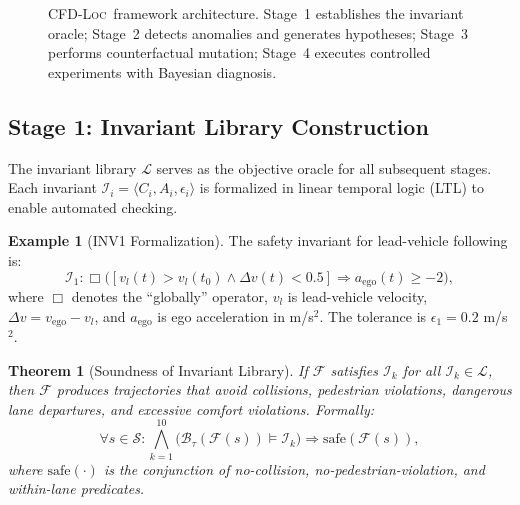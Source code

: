\documentclass[journal]{IEEEtran}
\theoremstyle{plain}
\newtheorem{theorem}{Theorem}[section]
\theoremstyle{definition}
\newtheorem{example}{Example}[section]
\theoremstyle{remark}
\newcommand{\methodname}{\textsc{CFD-Loc}}
\newcommand{\invlib}{\mathcal{L}}
\newcommand{\scenario}{\mathcal{S}}
\newcommand{\sys}{\mathcal{F}}
\newcommand{\beh}{\mathcal{B}}
\begin{document}
\begin{figure}[t]
\caption{\methodname\ framework architecture. Stage~1 establishes the invariant oracle; Stage~2 detects anomalies and generates hypotheses; Stage~3 performs counterfactual mutation; Stage~4 executes controlled experiments with Bayesian diagnosis.}
\label{fig:pipeline}
\end{figure}

\subsection{Stage 1: Invariant Library Construction}

The invariant library $\invlib$ serves as the objective oracle for all subsequent stages. Each invariant $\mathcal{I}_i = \langle C_i, A_i, \epsilon_i \rangle$ is formalized in linear temporal logic (LTL) to enable automated checking.

\begin{example}[INV1 Formalization]\label{ex:inv1}
The safety invariant for lead-vehicle following is:
\begin{equation}
\mathcal{I}_1: \Box \big( [v_l(t) > v_l(t_0) \land \Delta v(t) < 0.5] \Rightarrow a_{\text{ego}}(t) \geq -2 \big),
\label{eq:inv1}
\end{equation}
where $\Box$ denotes the ``globally'' operator, $v_l$ is lead-vehicle velocity, $\Delta v = v_{\text{ego}} - v_l$, and $a_{\text{ego}}$ is ego acceleration in m/s$^2$. The tolerance is $\epsilon_1 = 0.2$ m/s$^2$.
\end{example}

\begin{theorem}[Soundness of Invariant Library]\label{thm:soundness}
If $\sys$ satisfies $\mathcal{I}_k$ for all $\mathcal{I}_k \in \invlib$, then $\sys$ produces trajectories that avoid collisions, pedestrian violations, dangerous lane departures, and excessive comfort violations. Formally:
\begin{equation}
\forall s \in \scenario: \bigwedge_{k=1}^{10} \big( \beh_{\tau}(\sys(s)) \models \mathcal{I}_k \big) \Rightarrow \text{safe}(\sys(s)),
\label{eq:soundness}
\end{equation}
where $\text{safe}(\cdot)$ is the conjunction of no-collision, no-pedestrian-violation, and within-lane predicates.
\end{theorem}
\end{document}
